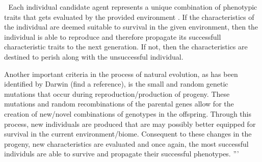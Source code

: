 
^^^
Each individual candidate agent represents a unique combination of phenotypic traits that gets evaluated by the provided environment \cite{EibenSmith2003}.
If the characteristics of the individual are deemed suitable to survival in the given environment, then the individual is able to reproduce and therefore propagate its successfull characteristic traits to the next generation. If not, then the characteristics are destined to perish along with the unsuccessful individual.

Another important criteria in the process of natural evolution, as has been identified by Darwin (find a reference), is the small and random genetic mutations that occur during reproduction/production of progeny. These mutations and random recombinations of the parental genes allow for the creation of new/novel combinations of genotypes in the offspring. Through this process, new individuals are produced that are may possibly better equipped for survival in the current environment/biome.
Consequent to these changes in the progeny, new characteristics are evaluated and once again, the most successful individuls are able to survive and propagate their successful phenotypes.
'''



